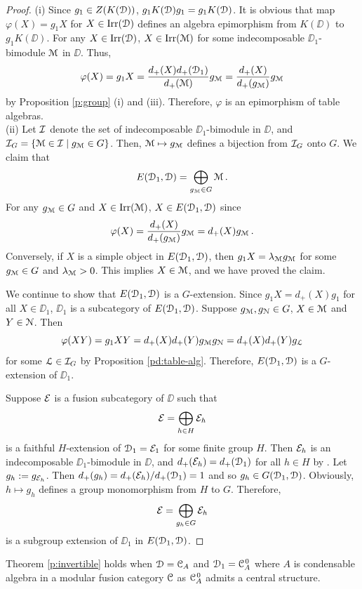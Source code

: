 \documentclass{amsart}
\begin{document}
\begin{proof} (i) Since $g_1 \in Z({K({\EuScript{D}})})$, $g_1 {K({\EuScript{D}})} g_1 = g_1 {K({\EuScript{D}})}$.  It is obvious that map $\varphi(X)=g_1X$ for $X \in {\operatorname{Irr}({\EuScript{D}})}$ defines an algebra epimorphism from $K(\DD)$ to $g_1K(\DD).$  For any $X \in {\operatorname{Irr}({\EuScript{D}})}$, $X \in \operatorname{Irr}({\EuScript{M}})$ for some indecomposable $\DD_1$-bimodule ${\EuScript{M}}$ in $\DD$. Thus, 
\begin{equation}
\varphi(X) = g_1 X = \frac{d_+(X) d_+({\EuScript{D}}_1)}{d_+({\EuScript{M}})} {g_{\EuScript{M}}}  = \frac{d_+(X)}{d_+({g_{\EuScript{M}}})} {g_{\EuScript{M}}}
\end{equation}
by Proposition \ref{p:group} (i) and (iii). Therefore, $\varphi$ is an epimorphism of table algebras.\\
(ii) Let ${\mathcal{I}}$ denote the set of indecomposable $\DD_1$-bimodule in $\DD$, and ${\mathcal{I}}_G =\{{\EuScript{M}} \in {\mathcal{I}}\mid {g_{\EuScript{M}}} \in G\}$.  Then, ${\EuScript{M}} \mapsto {g_{\EuScript{M}}}$ defines a bijection from ${\mathcal{I}}_G$ onto $G$. We claim that  
$$
{E({\EuScript{D}}_1, {\EuScript{D}})} = \bigoplus_{{g_{\EuScript{M}}} \in G} {\EuScript{M}}\,.
$$
For any ${g_{\EuScript{M}}} \in G$ and $X \in \operatorname{Irr}({\EuScript{M}})$,  $X \in {E({\EuScript{D}}_1, {\EuScript{D}})}$ since
$$
\varphi(X) =\frac{d_+(X)}{d_+({g_{\EuScript{M}}})} {g_{\EuScript{M}}} = d_+(X) {g_{\EuScript{M}}} \,.
$$ 
Conversely, if $X$ is a simple object in ${E({\EuScript{D}}_1, {\EuScript{D}})}$, then $g_1 X = \lambda_{\EuScript{M}} {g_{\EuScript{M}}}$ for some ${g_{\EuScript{M}}} \in G$ and $\lambda_{\EuScript{M}} > 0$. This implies $X \in {\EuScript{M}}$, and we have proved the claim.

We continue to show that ${E({\EuScript{D}}_1, {\EuScript{D}})}$ is a $G$-extension. Since $g_1 X = d_+(X) g_1$ for all $X \in \DD_1$, $\DD_1$ is a subcategory of ${E({\EuScript{D}}_1, {\EuScript{D}})}$. Suppose ${g_{\EuScript{M}}}, {g_{\EuScript{N}}} \in G$, $X \in {\EuScript{M}}$ and $Y \in {\EuScript{N}}$. Then
$$
\varphi(XY) =g_1XY = d_+(X) d_+(Y) {g_{\EuScript{M}}}{g_{\EuScript{N}}} = d_+(X) d_+(Y) {g_{\EuScript{L}}}
$$
for some ${\EuScript{L}} \in {\mathcal{I}}_G$ by Proposition \ref{pd:table-alg}.  Therefore, ${E({\EuScript{D}}_1, {\EuScript{D}})}$ is a $G$-extension of $\DD_1$.

Suppose $\mathcal{E}$ is a fusion subcategory of $\DD$ such that 
$$
\mathcal{E} = \bigoplus_{h \in H} \mathcal{E}_h
$$
is a faithful $H$-extension of ${\EuScript{D}}_1 = \mathcal{E}_1$ for some finite group $H$. Then $\mathcal{E}_h$ is an indecomposable $\DD_1$-bimodule in $\DD$, and $d_+(\mathcal{E}_h) = d_+({\EuScript{D}}_1)$ for all $h \in H$ by \cite[Thm. 3.5.2]{EGNO}. Let $g_h:=g_{\mathcal{E}_h}$. Then $d_+(g_h) = d_+(\mathcal{E}_h)/d_+({\EuScript{D}}_1) = 1$ and so $g_h \in {G({\EuScript{D}}_1, {\EuScript{D}})}$. Obviously, $h \mapsto g_h$ defines a group monomorphism from $H$ to $G$. Therefore,
 $$
\mathcal{E} = \bigoplus_{g_h \in G} \mathcal{E}_h
$$
is a subgroup extension of $\DD_1$ in ${E({\EuScript{D}}_1, {\EuScript{D}})}$. 
\end{proof}




\begin{rmk}  Theorem \ref{p:invertible} holds when ${\EuScript{D}}={{\EuScript{C}}_A}$ and ${\EuScript{D}}_1={{\EuScript{C}}_A^{\hspace{1pt}0}}$ where $A$ is condensable algebra in a modular fusion category ${\EuScript{C}}$ as ${{\EuScript{C}}_A^{\hspace{1pt}0}}$ admits a  central structure.
\end{rmk}
\end{document}
